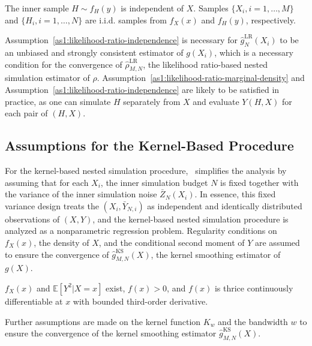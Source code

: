 \begin{assumption} \label{as1:likelihood-ratio-independence}
    The inner sample $H \sim f_H(y)$ is independent of $X$. Samples $\{X_i, i=1,\ldots,M\}$ and $\{H_i, i=1,\ldots,N\}$ are i.i.d. samples from $f_X(x)$ and $f_H(y)$, respectively.
\end{assumption}

Assumption~\ref{as1:likelihood-ratio-independence} is necessary for $\hat{g}^{\text{LR}}_N(X_i)$ to be an unbiased and strongly consistent estimator of $g(X_i)$, which is a necessary condition for the convergence of $\hat{\rho}^{\text{LR}}_{M,N}$, the likelihood ratio-based nested simulation estimator of $\rho$.
Assumption~\ref{as1:likelihood-ratio-marginal-density} and Assumption~\ref{as1:likelihood-ratio-independence} are likely to be satisfied in practice, as one can simulate $H$ separately from $X$ and evaluate $Y(H, X)$ for each pair of $(H, X)$.

\subsection{Assumptions for the Kernel-Based Procedure}
For the kernel-based nested simulation procedure,~\cite{hong2017kernel} simplifies the analysis by assuming that for each $X_i$, the inner simulation budget $N$ is fixed together with the variance of the inner simulation noise $\bar{Z}_N(X_i)$.
In essence, this fixed variance design treats the $(X_i, \bar{Y}_{N, i})$ as independent and identically distributed observations of $(X, Y)$, and the kernel-based nested simulation procedure is analyzed as a nonparametric regression problem.
Regularity conditions on $f_X(x)$, the density of $X$, and the conditional second moment of $Y$ are assumed to ensure the convergence of $\hat{g}^{\text{KS}}_{M, N}(X)$, the kernel smoothing estimator of $g(X)$.

\begin{assumption}
    $f_X(x)$ and $\mathbb{E} \left[ Y^2 | X = x \right]$ exist, $f(x) > 0$, and $f(x)$ is thrice continuously differentiable at $x$ with bounded third-order derivative.
\end{assumption}

Further assumptions are made on the kernel function $K_w$ and the bandwidth $w$ to ensure the convergence of the kernel smoothing estimator $\hat{g}^{\text{KS}}_{M, N}(X)$.

